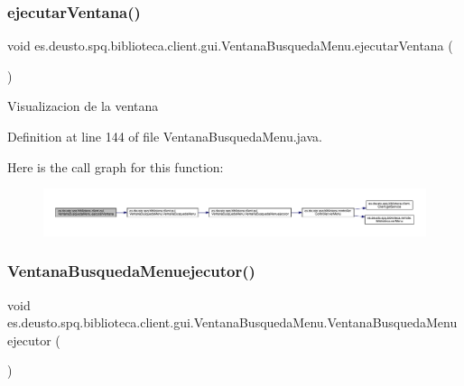 \subsubsection{\texorpdfstring{ejecutar\+Ventana()}{ejecutarVentana()}}
{\footnotesize\ttfamily void es.\+deusto.\+spq.\+biblioteca.\+client.\+gui.\+Ventana\+Busqueda\+Menu.\+ejecutar\+Ventana (\begin{DoxyParamCaption}{ }\end{DoxyParamCaption})}

Visualizacion de la ventana 

Definition at line 144 of file Ventana\+Busqueda\+Menu.\+java.

Here is the call graph for this function\+:
\nopagebreak
\begin{figure}[H]
\begin{center}
\leavevmode
\includegraphics[width=350pt]{classes_1_1deusto_1_1spq_1_1biblioteca_1_1client_1_1gui_1_1_ventana_busqueda_menu_a3680f3f4268980870f82f8a2c1a02890_cgraph}
\end{center}
\end{figure}
\mbox{\label{classes_1_1deusto_1_1spq_1_1biblioteca_1_1client_1_1gui_1_1_ventana_busqueda_menu_a2e14e0da230c4e460dd7e656b53622b0}} 
\subsubsection{\texorpdfstring{Ventana\+Busqueda\+Menuejecutor()}{VentanaBusquedaMenuejecutor()}}
{\footnotesize\ttfamily void es.\+deusto.\+spq.\+biblioteca.\+client.\+gui.\+Ventana\+Busqueda\+Menu.\+Ventana\+Busqueda\+Menuejecutor (\begin{DoxyParamCaption}{ }\end{DoxyParamCaption})}


